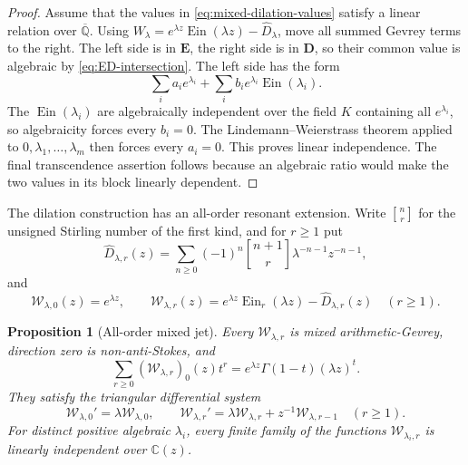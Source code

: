 \documentclass[11pt]{article}
\newtheorem{proposition}[theorem]{Proposition}
\theoremstyle{definition}
\theoremstyle{remark}
\newcommand{\Qbar}{\overline{\mathbb Q}}
\newcommand{\C}{\mathbb C}
\newcommand{\Ein}{\operatorname{Ein}}
\newcommand{\stirling}[2]{\genfrac{[}{]}{0pt}{}{#1}{#2}}
\begin{document}
\begin{proof}
Assume that the values in \eqref{eq:mixed-dilation-values} satisfy a
linear relation over \(\Qbar\).  Using
\(W_\lambda=e^{\lambda z}\Ein(\lambda z)-\widehat D_\lambda\), move all
summed Gevrey terms to the right.  The left side is in \(\mathbf E\), the
right side is in \(\mathbf D\), so their common value is algebraic by
\eqref{eq:ED-intersection}.  The left side has the form
\[
 \sum_i a_i e^{\lambda_i}
 +\sum_i b_i e^{\lambda_i}\Ein(\lambda_i).
\]
The \(\Ein(\lambda_i)\) are algebraically independent over the field \(K\)
containing all \(e^{\lambda_i}\), so algebraicity forces every \(b_i=0\).
The Lindemann--Weierstrass theorem applied to
\(0,\lambda_1,\ldots,\lambda_m\) then forces every \(a_i=0\).  This proves
linear independence.  The final transcendence assertion follows because
an algebraic ratio would make the two values in its block linearly
dependent.
\end{proof}

The dilation construction has an all-order resonant extension.  Write
\(\stirling{n}{r}\) for the unsigned Stirling number of the first kind, and for
\(r\ge1\) put
\begin{equation}\label{eq:all-order-Dhat}
 \widehat D_{\lambda,r}(z)=
 \sum_{n\ge0}(-1)^n\stirling{n+1}{r}
 \lambda^{-n-1}z^{-n-1},
\end{equation}
and
\begin{equation}\label{eq:all-order-mixed-family}
 \mathcal W_{\lambda,0}(z)=e^{\lambda z},\qquad
 \mathcal W_{\lambda,r}(z)
 =e^{\lambda z}\Ein_r(\lambda z)-\widehat D_{\lambda,r}(z)
 \quad(r\ge1).
\end{equation}

\begin{proposition}[All-order mixed jet]
\label{prop:all-order-mixed-jet}
Every \(\mathcal W_{\lambda,r}\) is mixed arithmetic-Gevrey, direction zero
is non-anti-Stokes, and
\begin{equation}\label{eq:all-order-mixed-generating}
 \boxed{\displaystyle
 \sum_{r\ge0}(\mathcal W_{\lambda,r})_0(z)t^r
 =e^{\lambda z}\Gamma(1-t)(\lambda z)^t.}
\end{equation}
They satisfy the triangular differential system
\begin{equation}\label{eq:all-order-mixed-system}
 \mathcal W_{\lambda,0}'=\lambda\mathcal W_{\lambda,0},
 \qquad
 \mathcal W_{\lambda,r}'
 =\lambda\mathcal W_{\lambda,r}+z^{-1}\mathcal W_{\lambda,r-1}
 \quad(r\ge1).
\end{equation}
For distinct positive algebraic \(\lambda_i\), every finite family of the
functions \(\mathcal W_{\lambda_i,r}\) is linearly independent over
\(\C(z)\).
\end{proposition}
\end{document}

